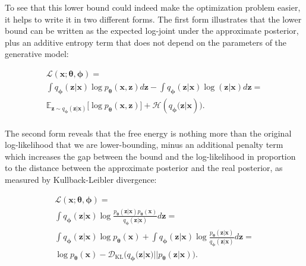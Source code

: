 \documentclass{report}
\begin{document}
\noindent To see that this lower bound could indeed make the optimization problem easier, it helps to write it in two different forms. The first form illustrates that the lower bound can be written as the expected log-joint under the approximate posterior, plus an additive entropy term that does not depend on the parameters of the generative model:

\begin{equation}
\begin{gathered}
\mathcal{L}(\boldsymbol{x}; \boldsymbol{\theta}, \boldsymbol{\phi}) = \\
\int q_{\boldsymbol{\phi}} (\boldsymbol{z}|\boldsymbol{x}) \log p_{\boldsymbol{\theta}}(\boldsymbol{x}, \boldsymbol{z}) d \boldsymbol{z} - \int q_{\boldsymbol{\phi}} (\boldsymbol{z}|\boldsymbol{x}) \log (\boldsymbol{z}|\boldsymbol{x}) d \boldsymbol{z} = \\
\mathbb{E}_{\boldsymbol{z} \sim q_{\boldsymbol{\phi}}(\boldsymbol{z}|\boldsymbol{x})} \big[ \log p_{\boldsymbol{\theta}}(\boldsymbol{x}, \boldsymbol{z}) \big] + \mathcal{H}(q_{\boldsymbol{\phi}} \big(\boldsymbol{z}|\boldsymbol{x}) \big).
\end{gathered}
\label{eq:free-energy-entropy}
\end{equation} \\

\noindent The second form reveals that the free energy is nothing more than the original log-likelihood that we are lower-bounding, minus an additional penalty term which increases the gap between the bound and the log-likelihood in proportion to the distance between the approximate posterior and the real posterior, as measured by Kullback-Leibler divergence:

\begin{equation}
\begin{gathered}
\mathcal{L}(\boldsymbol{x}; \boldsymbol{\theta}, \boldsymbol{\phi}) = \\
\int q_{\boldsymbol{\phi}}(\boldsymbol{z}|\boldsymbol{x}) \log \frac{p_{\boldsymbol{\theta}}(\boldsymbol{z}|\boldsymbol{x})p_{\boldsymbol{\theta}}(\boldsymbol{x})}{q_{\boldsymbol{\phi}}(\boldsymbol{z}|\boldsymbol{x})} d \boldsymbol{z} = \\
\int q_{\boldsymbol{\phi}}(\boldsymbol{z}|\boldsymbol{x}) \log p_{\boldsymbol{\theta}} (\boldsymbol{x}) + \int q_{\boldsymbol{\phi}}(\boldsymbol{z}|\boldsymbol{x}) \log \frac{p_{\boldsymbol{\theta}}(\boldsymbol{z}|\boldsymbol{x})}{q_{\boldsymbol{\phi}}(\boldsymbol{z}|\boldsymbol{x})} d \boldsymbol{z} = \\
\log p_{\boldsymbol{\theta}} (\boldsymbol{x}) - \mathcal{D}_\text{KL}\big(q_{\boldsymbol{\phi}}(\boldsymbol{z}|\boldsymbol{x}) || p_{\boldsymbol{\theta}}(\boldsymbol{z}|\boldsymbol{x}) \big).
\end{gathered}
\label{eq:free-energy-kl}
\end{equation} \\
\end{document}
